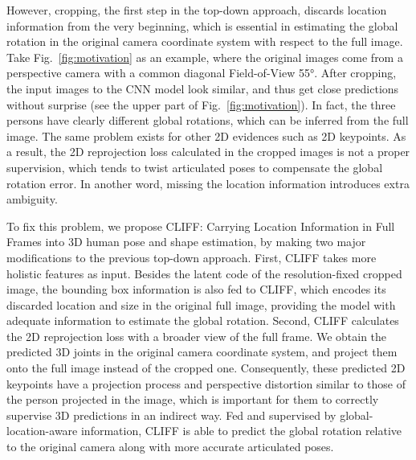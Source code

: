 \documentclass[runningheads]{llncs}
\begin{document}
However, cropping, the first step in the top-down approach, discards location information from the very beginning, which is essential in estimating the global rotation in the original camera coordinate system with respect to the full image.
Take Fig.~\ref{fig:motivation} as an example, where the original images come from a perspective camera with a common diagonal Field-of-View 55°.
After cropping, the input images to the CNN model look similar, and thus get close predictions without surprise (see the upper part of Fig.~\ref{fig:motivation}).
In fact, the three persons have clearly different global rotations, which can be inferred from the full image.
The same problem exists for other 2D evidences such as 2D keypoints.
As a result, the 2D reprojection loss calculated in the cropped images is not a proper supervision, which tends to twist articulated poses to compensate the global rotation error.
In another word, missing the location information introduces extra ambiguity.

To fix this problem, we propose CLIFF: Carrying Location Information in Full Frames into 3D human pose and shape estimation, by making two major modifications to the previous top-down approach.
First, CLIFF takes more holistic features as input.
Besides the latent code of the resolution-fixed cropped image, the bounding box information is also fed to CLIFF, which encodes its discarded location and size in the original full image, providing the model with adequate information to estimate the global rotation.
Second, CLIFF calculates the 2D reprojection loss with a broader view of the full frame.
We obtain the predicted 3D joints in the original camera coordinate system, and project them onto the full image instead of the cropped one.
Consequently, these predicted 2D keypoints have a projection process and perspective distortion similar to those of the person projected in the image, which is important for them to correctly supervise 3D predictions in an indirect way.
Fed and supervised by global-location-aware information, CLIFF is able to predict the global rotation relative to the original camera along with more accurate articulated poses.
\end{document}
